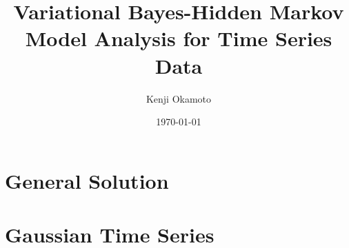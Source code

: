 \documentclass[a4paper,11pt,fleqn]{report}
\begin{document}
\title{ Variational Bayes-Hidden Markov Model Analysis for Time Series Data %
}
\author{ Kenji Okamoto }
\date{\today}
\maketitle

\tableofcontents

\chapter{ General Solution }




%
%
%

%
%

\chapter{ Gaussian Time Series }




%
\end{document}
